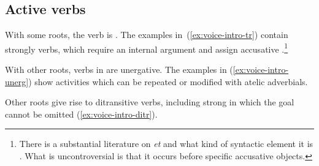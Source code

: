 	\subsection{Active verbs}
With some roots, the verb is . The examples in~(\ref{ex:voice-intro-tr}) contain strongly  verbs, which require an internal argument and assign accusative .\footnote{There is a substantial literature on \emph{et} and what kind of syntactic element it is \citep{siloni97,danon01,borer13oup}. What is uncontroversial is that it occurs before specific accusative objects.}
 \begin{exe}
 \ex \label{ex:voice-intro-tr} 
 \begin{xlist} 
	
	
 \z
\z 

With other roots, verbs in {\tkal} are unergative. The examples in (\ref{ex:voice-intro-unerg}) show activities which can be repeated or modified with atelic adverbials.
 \begin{exe}
 \ex \label{ex:voice-intro-unerg} 
 \begin{xlist} 
	
	
 \z
\z 

Other roots give rise to ditransitive verbs, including strong  in which the goal cannot be omitted (\ref{ex:voice-intro-ditr}).
 \begin{exe}
 \ex \label{ex:voice-intro-ditr} 
 \begin{xlist} 
	

\end{xlist}
\end{exe}
\end{xlist}
\end{exe}
\end{xlist}
\end{exe}
